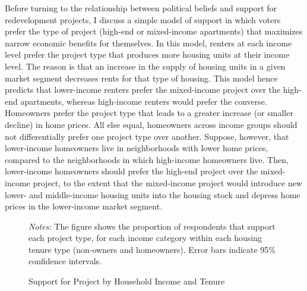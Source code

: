 \documentclass[article,12pt]{memoir}
\begin{document}
Before turning to the relationship between political beliefs and support for redevelopment projects, I discuss a simple model of support in which voters prefer the type of project (high-end or mixed-income apartments) that maximizes narrow economic benefits for themselves.  In this model, renters at each income level prefer the project type that produces more housing units at their income level.  The reason is that an increase in the supply of housing units in a given market segment decreases rents for that type of housing.  This model hence predicts that lower-income renters prefer the mixed-income project over the high-end apartments, whereas high-income renters would prefer the converse.  Homeowners prefer the project type that leads to a greater increase (or smaller decline) in home prices.  All else equal, homeowners across income groups should not differentially prefer one project type over another.  Suppose, however, that lower-income homeowners live in neighborhoods with lower home prices, compared to the neighborhoods in which high-income homeowners live. Then, lower-income homeowners should prefer the high-end project over the mixed-income project, to the extent that the mixed-income project would introduce new lower- and middle-income housing units into the housing stock and depress home prices in the lower-income market segment.

\begin{figure}[tb]\centering
  \caption{Support for Project by Household Income and Tenure}
  \label{fig:hg_e_income_tenure}
  \begin{measuredfigure}
  \end{measuredfigure}
  \begin{tablenotes}[flushleft]
    \item \hspace{-.2em}\emph{Notes:} The figure shows the proportion of respondents that support each project type, for each income category within each housing tenure type (non-owners and homeowners). Error bars indicate 95\% confidence intervals.
  \end{tablenotes}
\end{figure}
\end{document}
